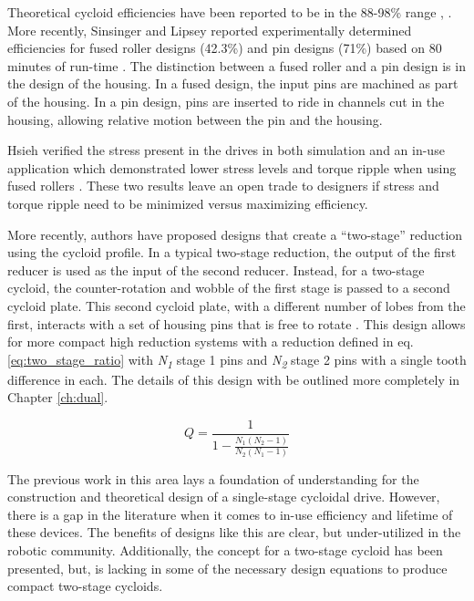 Theoretical cycloid efficiencies have been reported to be in the 88-98\% range \cite{ref:malhorta_2}, \cite{ref:unified_approach}.
More recently, Sinsinger and Lipsey reported experimentally determined efficiencies for fused roller designs (42.3\%) and pin designs (71\%) based on 80 minutes of run-time \cite{ref:cycloid_vs_harmonic}.
The distinction between a fused roller and a pin design is in the design of the housing.
In a fused design, the input pins are machined as part of the housing. 
In a pin design, pins are inserted to ride in channels cut in the housing, allowing relative motion between the pin and the housing.

Hsieh verified the stress present in the drives in both simulation and an in-use application which demonstrated lower stress levels and torque ripple when using fused rollers \cite{ref:hsieh_dynamics}.
These two results leave an open trade to designers if stress and torque ripple need to be minimized versus maximizing efficiency.

More recently, authors have proposed designs that create a ``two-stage'' reduction using the cycloid profile. In a typical two-stage reduction, the output of the first reducer is used as the input of the second reducer. Instead, for a two-stage cycloid, the counter-rotation and wobble of the first stage is passed to a second cycloid plate. This second cycloid plate, with a different number of lobes from the first, interacts with a set of housing pins that is free to rotate \cite{ref:new_two_stage}. This design allows for more compact high reduction systems with a reduction defined in eq. \ref{eq:two_stage_ratio} \cite{ref:two_stage_tooth_mod} with \textit{N\textsubscript{1}} stage 1 pins and \textit{N\textsubscript{2}} stage 2 pins with a single tooth difference in each. The details of this design with be outlined more completely in Chapter \ref{ch:dual}.

\begin{equation} \label{eq:two_stage_ratio}
Q = \frac{1}{1 - \frac{N_1 (N_2-1)}{N_2 (N_1-1)}}
\end{equation}

The previous work in this area lays a foundation of understanding for the construction and theoretical design of a single-stage cycloidal drive. However, there is a gap in the literature when it comes to in-use efficiency and lifetime of these devices. The benefits of designs like this are clear, but under-utilized in the robotic community. Additionally, the concept for a two-stage cycloid has been presented, but, is lacking in some of the necessary design equations to produce compact two-stage cycloids. 

